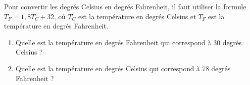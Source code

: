 
Pour convertir les degrés Celsius en degrés Fahrenheit, il faut utiliser la formule $T_F = 1,8T_C+32$, où $T_C$ est la température en degrés Celsius et $T_F$ est la température en degrés Fahrenheit.

\begin{enumerate}
\item Quelle est la température en degrés Fahrenheit qui correspond à 30 degrés Celsius ?
\item Quelle est la température en degrés Celsius qui correspond à 78 degrés Fahrenheit ?
\end{enumerate} 